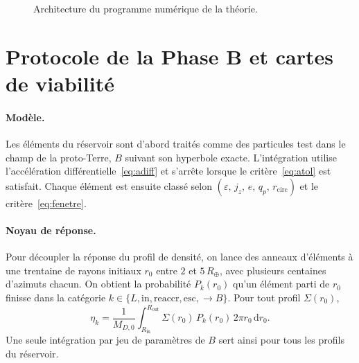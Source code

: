 \documentclass[11pt,a4paper,openany]{report}
\newcommand{\Rt}{R_{\oplus}}
\newcommand{\dd}{\mathrm{d}}
\begin{document}
\begin{figure}[htbp]
\centering
{}
\caption{Architecture du programme numérique de la théorie.}
\label{fig:programme}
\end{figure}


\section{Protocole de la Phase B et cartes de viabilité}

\paragraph{Modèle.}
Les éléments du réservoir sont d'abord traités comme des particules test dans le champ de la
proto-Terre, $B$ suivant son hyperbole exacte. L'intégration utilise l'accélération
différentielle~\eqref{eq:adiff} et s'arrête lorsque le critère~\eqref{eq:atol} est satisfait. Chaque
élément est ensuite classé selon $(\varepsilon,\,j_z,\,e,\,q_p,\,r_{\mathrm{circ}})$ et le
critère~\eqref{eq:fenetre}.

\paragraph{Noyau de réponse.}
Pour découpler la réponse du profil de densité, on lance des anneaux d'éléments à une trentaine
de rayons initiaux $r_0$ entre $2$ et $5\,\Rt$, avec plusieurs centaines d'azimuts chacun. On obtient
la probabilité $P_k(r_0)$ qu'un élément parti de $r_0$ finisse dans la catégorie
$k\in\{L,\mathrm{in},\mathrm{reaccr},\mathrm{esc},\to B\}$. Pour tout profil $\Sigma(r_0)$,
\begin{equation}
\eta_k=\frac{1}{M_{D,0}}\int_{R_{\mathrm{in}}}^{R_{\mathrm{out}}}\Sigma(r_0)\,P_k(r_0)\,2\pi r_0\,\dd r_0.
\label{eq:noyau}
\end{equation}
Une seule intégration par jeu de paramètres de $B$ sert ainsi pour tous les profils du réservoir.
\end{document}
